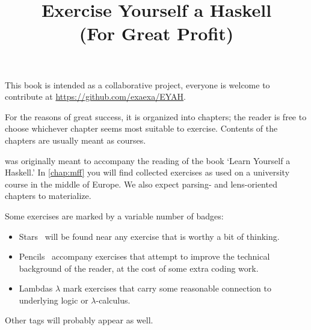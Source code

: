 \documentclass[10pt,a5paper]{book}
\title{Exercise Yourself a Haskell \\ \vspace{1em} \Large (For Great Profit)}
\date{}
\begin{document}
\sloppy

\maketitle

This book is intended as a collaborative project, everyone is welcome to
contribute at \url{https://github.com/exaexa/EYAH}.

For the reasons of great success, it is organized into chapters; the reader is
free to choose whichever chapter seems most suitable to exercise. Contents of
the chapters are usually meant as courses.

 was originally meant to accompany the reading of the book
`Learn Yourself a Haskell.' In \cref{chap:mff} you will find collected
exercises as used on a university course in the middle of Europe. We also
expect parsing- and lens-oriented chapters to materialize.

Some exercises are marked by a variable number of badges:
\begin{itemize}
\item Stars \FiveStar\ will be found near any exercise that is worthy a bit of
thinking.
\item Pencils \PencilLeftDown\ accompany exercises that attempt to improve
the technical background of the reader, at the cost of some extra coding work.
\item Lambdas {\large $\lambda$} mark exercises that carry some reasonable
connection to underlying logic or $\lambda$-calculus.
\end{itemize}
Other tags will probably appear as well.
\end{document}
